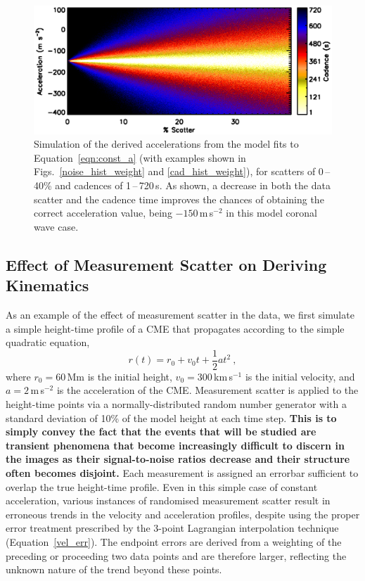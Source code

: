 \documentclass[structabstract]{aa}
\begin{document}
\begin{figure}[!b]
\begin{center}
\includegraphics[scale=0.53, trim=20 10 0 20]{images/fig_noise_cad.eps}
\caption{Simulation of the derived accelerations from the model fits to Equation~\ref{eqn:const_a} (with examples shown in Figs.~\ref{noise_hist_weight} and \ref{cad_hist_weight}), for scatters of 0\,--\,40\% and cadences of 1\,--\,720\,s. As shown, a decrease in both the data scatter and the cadence time improves the chances of obtaining the correct acceleration value, being $-150$\,m\,s$^{-2}$ in this model coronal wave case.}
\label{noise_test_image}
\end{center}
\end{figure}

\subsection{Effect of Measurement Scatter on Deriving Kinematics}
\label{subsect:noise}

As an example of the effect of measurement scatter in the data, we first simulate a simple height-time profile of a CME that propagates according to the simple quadratic equation,
\begin{equation}
\label{eqn:const_a}
r(t) = r_0 + v_0 t + \frac{1}{2}a t^2 \ ,
\end{equation}
where $r_0=60$\,Mm is the initial height, $v_0=300$\,km\,s$^{-1}$ is the initial velocity, and $a=2$\,m\,s$^{-2}$ is the acceleration of the CME. Measurement scatter is applied to the height-time points via a normally-distributed random number generator with a standard deviation of 10\% of the model height at each time step. {\bf This is to simply convey the fact that the events that will be studied are transient phenomena that become increasingly difficult to discern in the images as their signal-to-noise ratios decrease and their structure often becomes disjoint.} Each measurement is assigned an errorbar sufficient to overlap the true height-time profile. Even in this simple case of constant acceleration, various instances of randomised measurement scatter result in erroneous trends in the velocity and acceleration profiles, despite using the proper error treatment prescribed by the 3-point Lagrangian interpolation technique (Equation~\ref{vel_err}). The endpoint errors are derived from a weighting of the preceding or proceeding two data points and are therefore larger, reflecting the unknown nature of the trend beyond these points.
\end{document}
